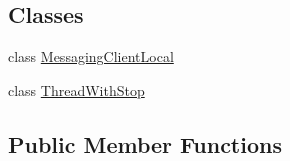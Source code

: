 \subsection*{Classes}
\begin{DoxyCompactItemize}
\item 
class \hyperlink{classgov_1_1fnal_1_1ppd_1_1dd_1_1display_1_1client_1_1DisplayControllerMessagingAbstract_1_1MessagingClientLocal}{Messaging\-Client\-Local}
\item 
class \hyperlink{classgov_1_1fnal_1_1ppd_1_1dd_1_1display_1_1client_1_1DisplayControllerMessagingAbstract_1_1ThreadWithStop}{Thread\-With\-Stop}
\end{DoxyCompactItemize}
\subsection*{Public Member Functions}
